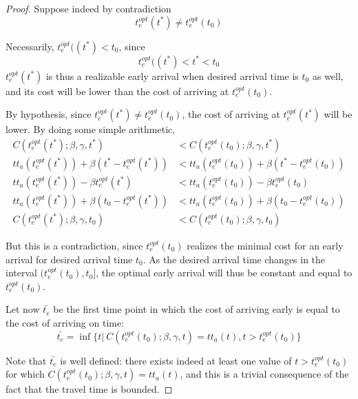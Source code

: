\begin{proof}
  Suppose indeed by contradiction
  \begin{equation*}
    t_e^{opt}(t^*) \neq t_e^{opt}(t_0)
  \end{equation*}

  Necessarily, \(t_e^{opt}((t^*) < t_0\), since
  \begin{equation*}
    t_e^{opt}((t^*) < t^* < t_0
  \end{equation*}
  \(t_e^{opt}(t^*)\) is thus a realizable early arrival when desired arrival time is \(t_0\) as well,
  and its cost will be lower than the cost of arriving at \(t_e^{opt}(t_0)\).

  By hypothesis, since \(t_e^{opt}(t^*) \neq t_e^{opt}(t_0)\),
  the cost of arriving at \(t_e^{opt}(t^*)\) will be lower.
  By doing some simple arithmetic,
  \begin{align*}
    C(t_e^{opt}(t^*); \beta, \gamma, t^*) & < C(t_e^{opt}(t_0); \beta, \gamma, t^*) \\
    tt_a(t_e^{opt}(t^*)) + \beta(t^* - t_e^{opt}(t^*)) & < tt_a(t_e^{opt}(t_0)) + \beta(t^* - t_e^{opt}(t_0)) \\
    tt_a(t_e^{opt}(t^*)) - \beta t_e^{opt}(t^*) & < tt_a(t_e^{opt}(t_0)) - \beta t_e^{opt}(t_0) \\
     tt_a(t_e^{opt}(t^*)) + \beta(t_0 - t_e^{opt}(t^*)) & < tt_a(t_e^{opt}(t_0)) + \beta(t_0 - t_e^{opt}(t_0)) \\
    C(t_e^{opt}(t^*); \beta, \gamma, t_0) & < C(t_e^{opt}(t_0); \beta, \gamma, t_0)
  \end{align*}
  
  But this is a contradiction, since \(t_e^{opt}(t_0)\) realizes the minimal cost for an early arrival for desired arrival time \(t_0\).
  As the desired arrival time changes in the interval \((t_e^{opt}(t_0), t_0]\),
  the optimal early arrival will thus be constant and equal to \(t_e^{opt}(t_0)\).

  Let now \(\bar{t_e}\) be the first time point in which the cost of arriving early is equal to the cost of arriving on time:
  \begin{equation*}
    \bar{t_e} = \inf\{t |\ C(t_e^{opt}(t_0); \beta, \gamma, t) = tt_a(t), t > t_e^{opt}(t_0)\}
  \end{equation*}

  Note that \(\bar{t_e}\) is well defined:
  there exists indeed at least one value of \(t > t_e^{opt}(t_0)\) for which \(C(t_e^{opt}(t_0); \beta, \gamma, t) = tt_a(t)\),
  and this is a trivial consequence of the fact that the travel time is bounded.


\end{proof}
